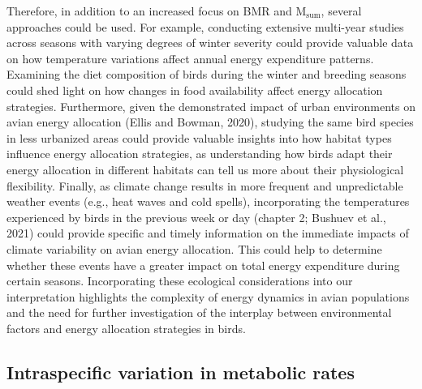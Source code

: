 \documentclass[10pt, twoside]{book} %
\begin{document}
Therefore, in addition to an increased focus on BMR and M$_{\text{sum}}$, several approaches could be used. For example, conducting extensive multi-year studies across seasons with varying degrees of winter severity could provide valuable data on how temperature variations affect annual energy expenditure patterns. Examining the diet composition of birds during the winter and breeding seasons could shed light on how changes in food availability affect energy allocation strategies. Furthermore, given the demonstrated impact of urban environments on avian energy allocation (Ellis and Bowman, 2020), studying the same bird species in less urbanized areas could provide valuable insights into how habitat types influence energy allocation strategies, as understanding how birds adapt their energy allocation in different habitats can tell us more about their physiological flexibility. Finally, as climate change results in more frequent and unpredictable weather events (e.g., heat waves and cold spells), incorporating the temperatures experienced by birds in the previous week or day (chapter 2; Bushuev et al., 2021) could provide specific and timely information on the immediate impacts of climate variability on avian energy allocation. This could help to determine whether these events have a greater impact on total energy expenditure during certain seasons. Incorporating these ecological considerations into our interpretation highlights the complexity of energy dynamics in avian populations and the need for further investigation of the interplay between environmental factors and energy allocation strategies in birds.\\

\subsection{Intraspecific variation in metabolic rates}
\end{document}

